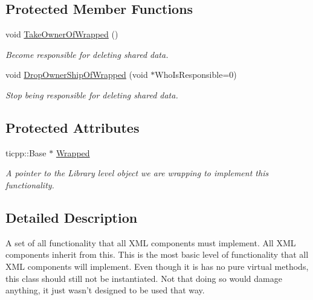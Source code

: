 \subsection*{Protected Member Functions}
\begin{DoxyCompactItemize}
\item 
void \hyperlink{classphys_1_1xml_1_1Base_af82b917122f0c1e0894b21e7b95478cf}{TakeOwnerOfWrapped} ()
\begin{DoxyCompactList}\small\item\em Become responsible for deleting shared data. \item\end{DoxyCompactList}\item 
void \hyperlink{classphys_1_1xml_1_1Base_a0b9d876ccdc2274a1085ee81f73fb8d5}{DropOwnerShipOfWrapped} (void $\ast$WhoIsResponsible=0)
\begin{DoxyCompactList}\small\item\em Stop being responsible for deleting shared data. \item\end{DoxyCompactList}\end{DoxyCompactItemize}
\subsection*{Protected Attributes}
\begin{DoxyCompactItemize}
\item 
ticpp::Base $\ast$ \hyperlink{classphys_1_1xml_1_1Base_a95edc995971b4ed433945a1a8843127e}{Wrapped}
\begin{DoxyCompactList}\small\item\em A pointer to the Library level object we are wrapping to implement this functionality. \item\end{DoxyCompactList}\end{DoxyCompactItemize}


\subsection{Detailed Description}
A set of all functionality that all XML components must implement. All XML components inherit from this. This is the most basic level of functionality that all XML components will implement. Even though it is has no pure virtual methods, this class should still not be instantiated. Not that doing so would damage anything, it just wasn't designed to be used that way.

